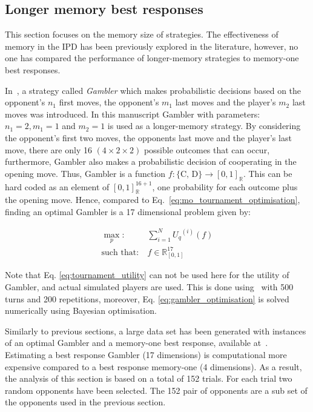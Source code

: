 \documentclass[10pt]{article}
\newcommand{\R}{\mathbb{R}}
\begin{document}
\subsection{Longer memory best responses}

This section focuses on the memory size of strategies. The effectiveness of
memory in the IPD has been previously explored in the literature, however, no one
has compared the performance of longer-memory
strategies to memory-one best responses.

In~\cite{Harper2017}, a strategy called \textit{Gambler} which makes
probabilistic decisions based on the opponent's \(n_1\) first moves, the
opponent's \(m_1\) last moves and the player's \(m_2\) last moves was
introduced. In this manuscript Gambler with parameters: $n_1 = 2, m_1 = 1$ and $m_2 = 1$ is used
as a longer-memory strategy.
By considering the opponent's first two moves, the opponents last move and the
player's last move, there are only 16 $(4 \times 2 \times 2)$ possible outcomes
that can occur, furthermore, Gambler also makes a probabilistic decision of
cooperating in the opening move. Thus, Gambler is a function \(f: \{\text{C,
D}\} \rightarrow [0, 1]_{\R}\). This can be hard coded as an element
of \([0, 1]_{\R} ^ {16 + 1}\), one probability for each outcome plus the opening
move. Hence, compared to Eq.~\ref{eq:mo_tournament_optimisation}, finding an
optimal Gambler is a 17 dimensional problem given by:

\begin{equation}\label{eq:gambler_optimisation}
    \begin{aligned}
    \max_p: & \ \sum_{i=1} ^ {N} {U_q}^{(i)} (f)
    \\
    \text{such that}: & \ f \in \R_{[0, 1]}^{17}
    \end{aligned}
\end{equation}

Note that Eq. \ref{eq:tournament_utility} can not be used here for the utility
of Gambler, and actual simulated players are used. This is done using~\cite{axelrodproject}
with 500 turns and 200 repetitions, moreover, Eq. \ref{eq:gambler_optimisation}
is solved numerically using Bayesian optimisation.

Similarly to previous sections, a large data set has been generated with
instances of an optimal Gambler and a memory-one best response, available
at~\cite{glynatsi2019}. Estimating a best response Gambler (17 dimensions) is
computational more expensive compared to a best response memory-one (4
dimensions). As a result, the analysis of this section is based on a total of
152 trials. For each trial two random opponents have been selected. The 152 pair
of opponents are a sub set of the opponents used in the previous section.
\end{document}
